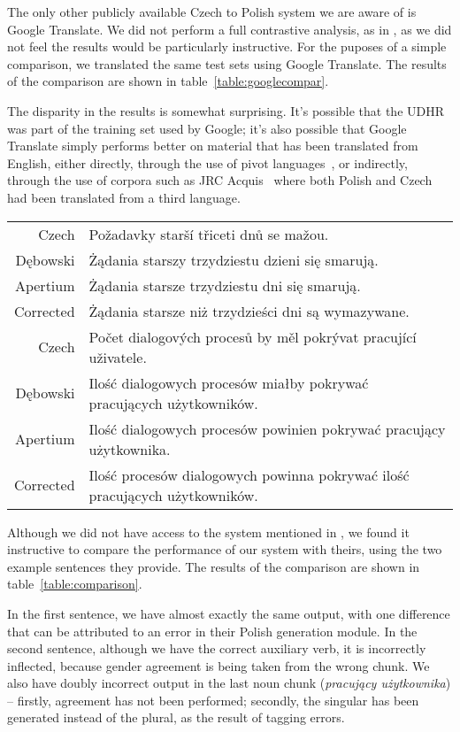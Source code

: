 \documentclass[11pt]{article}
\begin{document}
The only other publicly available Czech to Polish system we are aware of is Google Translate. We did not
perform a full contrastive analysis, as in \cite{tyers2009rfr}, as we did not
feel the results would be particularly instructive. For the puposes of a simple
comparison, we translated the same test sets using Google Translate. The results
of the comparison are shown in table~\ref{table:googlecompar}.

The disparity in the results is somewhat surprising. It's possible that the UDHR
was part of the training set used by Google; it's also possible that Google Translate
simply performs better on material that has been translated from English, either
directly, through the use of pivot languages~\citep{Kumar07}, or indirectly, through
the use of corpora such as JRC Acquis~\citep{Steinberger2006} where both Polish and
Czech had been translated from a third language. 

\begin{table*}
\centering
\begin{tabular}{|r|l|}
\hline
Czech & Požadavky starší třiceti dnů se mažou.\\
Dębowski & Żądania starszy trzydziestu dzieni się smarują.\\
Apertium & Żądania starsze trzydziestu dni się smarują.\\
Corrected & Żądania starsze niż trzydzieści dni są wymazywane.\\
\hline
Czech & Počet dialogových procesů by měl pokrývat pracující uživatele.\\
Dębowski & Ilość dialogowych procesów miałby pokrywać pracujących użytkowników.\\
Apertium & Ilość dialogowych procesów powinien pokrywać pracujący użytkownika. \\
Corrected & Ilość procesów dialogowych powinna pokrywać ilość pracujących użytkowników.\\
\hline
\end{tabular}
    \caption{A comparison of Dębowski and our system.}
    \label{table:comparison}
\end{table*}

Although we did not have access to the system mentioned in \cite{Debowski02}, we
found it instructive to compare the performance of our system with theirs, using
the two example sentences they provide. The results
of the comparison are shown in table~\ref{table:comparison}.

In the first sentence, we have almost exactly the same output, with one difference
that can be attributed to an error in their Polish generation module. In the second
sentence, although we have the correct auxiliary verb, it is incorrectly inflected, 
because gender agreement is being taken from the wrong chunk. We also have doubly
incorrect output in the last noun chunk (\emph{pracujący użytkownika}) -- firstly,
agreement has not been performed; secondly, the singular has been generated instead
of the plural, as the result of tagging errors.
\end{document}
